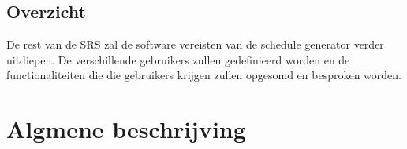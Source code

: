 \documentclass{article}
\begin{document}

\subsection{Overzicht}

De rest van de SRS zal de software vereisten van de schedule generator verder uitdiepen. De verschillende gebruikers zullen gedefinieerd worden en de functionaliteiten die die gebruikers krijgen zullen opgesomd en besproken worden.

\newpage

\section{Algmene beschrijving}

\end{document}
